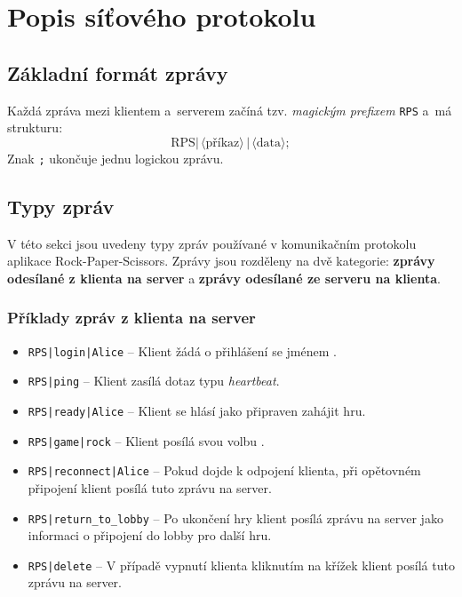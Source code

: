 \documentclass[12pt, a4paper]{article}
\begin{document}
\section{Popis síťového protokolu}

\subsection{Základní formát zprávy}
Každá zpráva mezi klientem a~serverem začíná tzv. \textit{magickým prefixem} \verb|RPS| a~má strukturu:
\[
  \text{RPS}|\,\langle\text{příkaz}\rangle\,|\,\langle\text{data}\rangle;
\]
Znak \texttt{;} ukončuje jednu logickou zprávu.

\subsection{Typy zpráv}

V této sekci jsou uvedeny typy zpráv používané v komunikačním protokolu aplikace Rock-Paper-Scissors. Zprávy jsou rozděleny na dvě kategorie: \textbf{zprávy odesílané z klienta na server} a \textbf{zprávy odesílané ze serveru na klienta}.

\subsubsection{Příklady zpráv z klienta na server}
\begin{itemize}
  \item \texttt{RPS|login|Alice} -- Klient žádá o přihlášení se jménem .
  \item \texttt{RPS|ping} -- Klient zasílá dotaz typu \emph{heartbeat}.
  \item \texttt{RPS|ready|Alice} -- Klient se hlásí jako připraven zahájit hru.
  \item \texttt{RPS|game|rock} -- Klient posílá svou volbu .
  \item \texttt{RPS|reconnect|Alice} -- Pokud dojde k odpojení klienta, při opětovném připojení klient posílá tuto zprávu na server.
  \item \texttt{RPS|return\_to\_lobby} -- Po ukončení hry klient posílá zprávu na server jako informaci o připojení do lobby pro další hru.
  \item \texttt{RPS|delete} -- V případě vypnutí klienta kliknutím na křížek klient posílá tuto zprávu na server.
\end{itemize}
\end{document}

